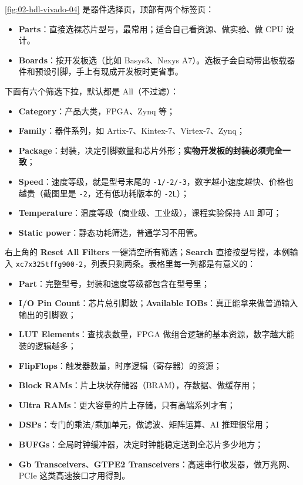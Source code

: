 \cref{fig:02-hdl-vivado-04} 是器件选择页，顶部有两个标签页：

\begin{itemize}
  \item \textbf{Parts}：直接选裸芯片型号，最常用；适合自己看资源、做实验、做 CPU 设计。
  \item \textbf{Boards}：按开发板选（比如 Basys3、Nexys A7）。选板子会自动带出板载器件和预设引脚，手上有现成开发板时更省事。
\end{itemize}

下面有六个筛选下拉，默认都是 All（不过滤）：

\begin{itemize}
  \item \textbf{Category}：产品大类，FPGA、Zynq 等；
  \item \textbf{Family}：器件系列，如 Artix-7、Kintex-7、Virtex-7、Zynq；
  \item \textbf{Package}：封装，决定引脚数量和芯片外形；\textbf{实物开发板的封装必须完全一致}；
  \item \textbf{Speed}：速度等级，就是型号末尾的 \texttt{-1/-2/-3}，数字越小速度越快、价格也越贵（截图里是 \texttt{-2}，还有低功耗版本的 \texttt{-2L}）；
  \item \textbf{Temperature}：温度等级（商业级、工业级），课程实验保持 All 即可；
  \item \textbf{Static power}：静态功耗筛选，普通学习不用管。
\end{itemize}

右上角的 \textbf{Reset All Filters} 一键清空所有筛选；\textbf{Search} 直接按型号搜，本例输入 \texttt{xc7x325tffg900-2}，列表只剩两条。表格里每一列都是有意义的：

\begin{itemize}
  \item \textbf{Part}：完整型号，封装和速度等级都包含在型号里；
  \item \textbf{I/O Pin Count}：芯片总引脚数；\textbf{Available IOBs}：真正能拿来做普通输入输出的引脚数；
  \item \textbf{LUT Elements}：查找表数量，FPGA 做组合逻辑的基本资源，数字越大能装的逻辑越多；
  \item \textbf{FlipFlops}：触发器数量，时序逻辑（寄存器）的资源；
  \item \textbf{Block RAMs}：片上块状存储器（BRAM），存数据、做缓存用；
  \item \textbf{Ultra RAMs}：更大容量的片上存储，只有高端系列才有；
  \item \textbf{DSPs}：专门的乘法/乘加单元，做滤波、矩阵运算、AI 推理很常用；
  \item \textbf{BUFGs}：全局时钟缓冲器，决定时钟能稳定送到全芯片多少地方；
  \item \textbf{Gb Transceivers}、\textbf{GTPE2 Transceivers}：高速串行收发器，做万兆网、PCIe 这类高速接口才用得到。
\end{itemize}

